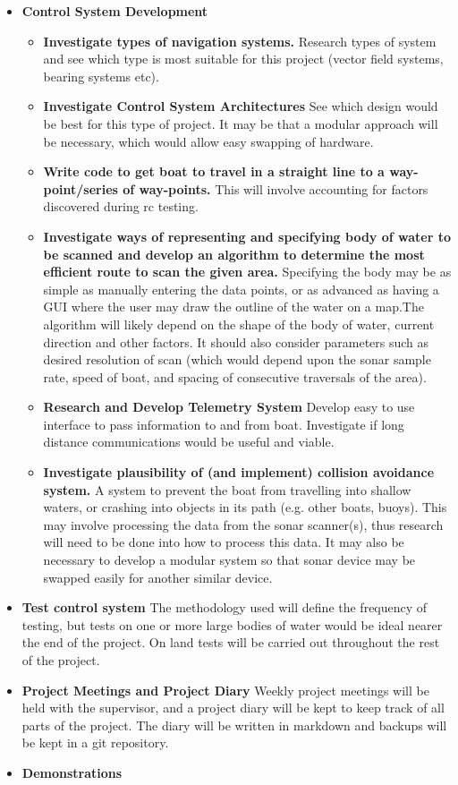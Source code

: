 \documentclass[titlepage 12pt]{article}
\begin{document}
{\begin{itemize}
\item \textbf{Control System Development} 
	\begin{itemize}
	\item \textbf{Investigate types of navigation systems.} Research types of system and see which type is most suitable for this project (vector field systems, bearing systems etc). 
	\item \textbf{Investigate Control System Architectures} See which design would be best for this type of project. It may be that a modular approach will be necessary, which would allow easy swapping of hardware.
	\item \textbf{Write code to get boat to travel in a straight line to a way-point/series of way-points.} This will involve accounting for factors discovered during rc testing.
	\item \textbf{Investigate ways of representing and specifying body of water to be scanned and develop an algorithm to determine the most efficient route to scan the given area.} Specifying the body may be as simple as manually entering the data points, or as advanced as having a GUI where the user may draw the outline of the water on a map.The algorithm will likely depend on the shape of the body of water, current direction and other factors. It should also consider parameters such as desired resolution of scan (which would depend upon the sonar sample rate, speed of boat, and spacing of consecutive traversals of the area).
	\item \textbf{Research and Develop Telemetry System} Develop easy to use interface to pass information to and from boat. Investigate if long distance communications would be useful and viable.
	\item \textbf{Investigate plausibility of (and implement) collision avoidance system.} A system to prevent the boat from travelling into shallow waters, or crashing into objects in its path (e.g. other boats, buoys). This may involve processing the data from the sonar scanner(s), thus research will need to be done into how to process this data. It may also be necessary to develop a modular system so that sonar device may be swapped easily for another similar device.
	\end{itemize}

\item \textbf{Test control system} The methodology used will define the frequency of testing, but tests on one or more large bodies of water would be ideal nearer the end of the project. On land tests will be carried out throughout the rest of the project.
\item \textbf{Project Meetings and Project Diary} Weekly project meetings will be held with the supervisor, and a project diary will be kept to keep track of all parts of the project. The diary will be written in markdown and backups will be kept in a git repository.
\item \textbf{Demonstrations}
\end{itemize}




}
\end{document}
